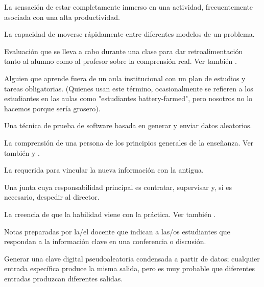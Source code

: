 \begin{description}
 La sensación de estar completamente inmerso en una actividad, 
frecuentemente asociada con una alta productividad.

 La capacidad de moverse
rápidamente entre diferentes modelos de un problema.

 Evaluación que se lleva a cabo 
durante una clase para dar retroalimentación tanto al alumno como al profesor 
sobre la comprensión real. Ver
también .

 Alguien que aprende fuera de un aula institucional con un plan de estudios y tareas obligatorias. (Quienes usan este término, ocasionalmente se refieren a los estudiantes en las aulas como "estudiantes battery-farmed", pero nosotros no lo hacemos porque sería grosero).

 Una técnica de prueba de software 
basada en generar y enviar datos aleatorios.

 La 
comprensión de una persona de los principios generales de la enseñanza. Ver también
y .

 La 
requerida para vincular la nueva información con la antigua.

 Una junta cuya responsabilidad principal es
contratar, supervisar y, si es necesario, despedir al director.

 La creencia de que la habilidad 
viene con la práctica. Ver también .

 Notas preparadas por la/el docente que indican a las/os 
estudiantes que respondan a la información clave en una conferencia o discusión.

 Generar una clave digital pseudoaleatoria condensada a partir de datos; cualquier entrada específica produce la misma salida, pero es muy probable que diferentes entradas produzcan diferentes salidas.


\end{description}
